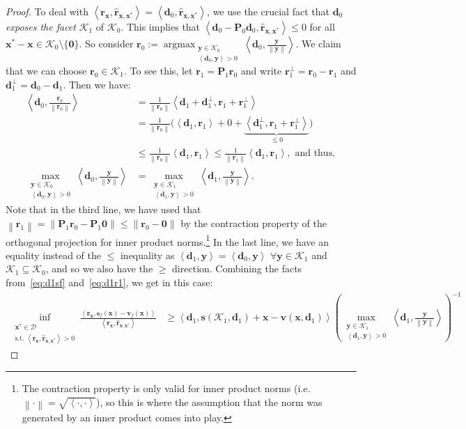 \documentclass{article} %
\DeclareMathOperator*{\argmax}{\arg\max}
\providecommand{\norm}[1]{\left\lVert#1\right\rVert}
\newcommand{\domain}{\mathcal{D}}
\newcommand{\x}{\bm{x}}
\newcommand{\y}{\bm{y}}
\newcommand{\s}{\bm{s}}
\newcommand{\dd}{\bm{d}}
\newcommand{\vv}{\bm{v}} %
\renewcommand{\r}{\bm{r}}
\newcommand{\innerProd}[2]{\left\langle #1 , #2 \right\rangle}
\newcommand{\proj}{\bm{P}}
\newcommand{\Kface}{\mathcal{K}}
\newcommand{\0}{\mathbf{0}} %
\begin{document}
\begin{proof}
To deal with $\innerProd{\r_{\x}}{ \hat{\r}_{\x,\x^*}} = \innerProd{\dd_0}{ \hat{\r}_{\x,\x^*}}$, we use the crucial fact that $\dd_0$ \emph{exposes the facet} $\Kface_1$ of $\Kface_0$. This implies that $\innerProd{\dd_0-\proj_0 \dd_0}{ \hat{\r}_{\x,\x^*}} \leq 0$ for all $\x^*-\x \in \Kface_0 \setminus \{\0\}$. So consider $\r_0 := \displaystyle \argmax_{\substack{\y \in \Kface_0 \\ 
				 \innerProd{\dd_0}{\y} > 0}} \innerProd{\dd_0}{ \frac{\y}{\norm{\y}}}$. 
We claim that we can choose $\r_0 \in \Kface_1$. To see this, let $\r_1 = \proj_1 \r_0$ and write $\r_1^\perp = \r_0 - \r_1$ and $\dd_1^\perp = \dd_0 - \dd_1$. Then we have:
\begin{align}
  \innerProd{\dd_0}{\frac{\r_0}{\norm{\r_0} }}  &= \frac{1}{\norm{\r_0}} \innerProd{\dd_1 + \dd_1^\perp}{\r_1 + \r_1^\perp} \nonumber \\
	&= \frac{1}{\norm{\r_0}} \big( \innerProd{\dd_1}{\r_1} + 0 + \underbrace{\innerProd{\dd_1^\perp}{\r_1+\r_1^\perp}}_{\leq 0} \big) \nonumber \\
	&\leq  \frac{1}{\norm{\r_0}} \innerProd{\dd_1}{\r_1} \leq  \frac{1}{\norm{\r_1}} \innerProd{\dd_1}{\r_1}, \text{ and thus} , \nonumber \\
\max_{\substack{\y \in \Kface_0 \\ 
				 \innerProd{\dd_0}{\y} > 0}} \innerProd{\dd_0}{ \frac{\y}{\norm{\y}}} &= 
		\max_{\substack{\y \in \Kface_1 \\ 
						 \innerProd{\dd_1}{\y} > 0}} \innerProd{\dd_1}{ \frac{\y}{\norm{\y}}} .		 
 \label{eq:d1r1}
\end{align}
Note that in the third line, we have used that $\norm{\r_1} = \norm{\proj_1 \r_0 - \proj_1 \0} \leq \norm{\r_0 - \0}$ by the contraction property of the orthogonal projection for inner product norms.\footnote{The contraction property is only valid for inner product norms (i.e. $\norm{\cdot} = \sqrt{ \innerProd{\cdot}{\cdot}}$), so this is where the assumption that the norm was generated by an inner product comes into play. 
%
} In the last line, we have an equality instead of the $\leq$ inequality as $\innerProd{\dd_1}{\y} = \innerProd{\dd_0}{\y}$ $\forall \y \in \Kface_1$ and $\Kface_1 \subseteq \Kface_0$, and so we also have the $\geq$ direction. Combining the facts from~\eqref{eq:d1sf} and~\eqref{eq:d1r1}, we get in this case:
\begin{align*}
	\inf_{\substack{\x^* \in \domain\\
               \textrm{s.t. } \innerProd{\r_{\x}}{ \hat{\r}_{\x,\x^*}} > 0}}
                       \frac{\innerProd{\r_{\x}}{ \s_f(\x) - \vv_f(\x)}}{\innerProd{\r_{\x}}{ \hat{\r}_{\x,\x^*}}} 
                       &\geq  \innerProd{\dd_1}{\s(\Kface_1, \dd_1)+\x - \vv(\x, \dd_1)} 	\left( \max_{\substack{\y \in \Kface_1 \\ 
                       						 \innerProd{\dd_1}{\y} > 0}} \innerProd{\dd_1}{ \frac{\y}{\norm{\y}}} \right)^{-1} 
\end{align*}


\end{proof}
\end{document}
